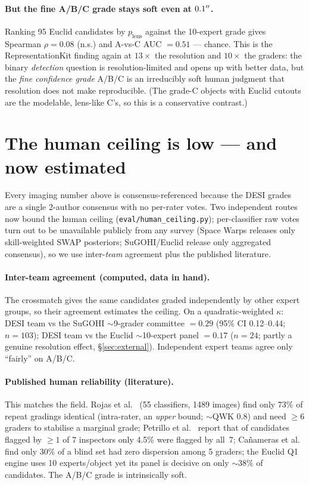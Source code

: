 \documentclass[11pt,letterpaper]{article}
\newcommand{\plens}{\ensuremath{p_{\mathrm{lens}}}}
\newcommand{\eucRankRho}{0.08}       %
\newcommand{\eucRankAUC}{0.51}       %
\newcommand{\ceilSugohi}{0.29}       %
\newcommand{\ceilSugohiCI}{0.12--0.44}
\newcommand{\ceilEuclid}{0.17}       %
\newcommand{\rojasIntra}{73}         %
\newcommand{\rojasQWK}{0.8}          %
\newcommand{\euclidDecisive}{38}     %
\begin{document}
\paragraph{But the fine A/B/C grade stays soft even at $0.1^{\prime\prime}$.} Ranking 95 Euclid candidates
by \plens{} against the 10-expert grade gives Spearman $\rho=\eucRankRho$ (n.s.) and A-vs-C
AUC $=\eucRankAUC$ --- chance. This is the RepresentationKit finding again at $13\times$ the
resolution and $10\times$ the graders: the binary \emph{detection} question is resolution-limited
and opens up with better data, but the \emph{fine confidence grade} A/B/C is an irreducibly soft
human judgment that resolution does not make reproducible. (The grade-C objects with Euclid cutouts
are the modelable, lens-like C's, so this is a conservative contrast.)

\section{The human ceiling is low --- and now estimated}
\label{sec:ceiling}
Every imaging number above is consensus-referenced because the DESI grades are a single
2-author consensus with no per-rater votes. Two independent routes now bound the human ceiling
(\texttt{eval/human\_ceiling.py}); per-classifier raw votes turn out to be unavailable publicly
from any survey (Space Warps releases only skill-weighted SWAP posteriors; SuGOHI/Euclid release
only aggregated consensus), so we use inter-\emph{team} agreement plus the published literature.

\paragraph{Inter-team agreement (computed, data in hand).} The crossmatch gives the same candidates
graded independently by other expert groups, so their agreement estimates the ceiling. On a
quadratic-weighted $\kappa$: DESI team vs the SuGOHI $\sim$9-grader committee $=\ceilSugohi$
(95\% CI \ceilSugohiCI; $n=103$); DESI team vs the Euclid $\sim$10-expert panel $=\ceilEuclid$
($n=24$; partly a genuine resolution effect, \S\ref{sec:external}). Independent expert teams agree
only ``fairly'' on A/B/C.

\paragraph{Published human reliability (literature).} This matches the field. Rojas et al.\
\citep{rojas2023vi} (55 classifiers, 1489 images) find only $\rojasIntra\%$ of repeat gradings
identical (intra-rater, an \emph{upper} bound; $\sim$QWK $\rojasQWK$) and need $\ge6$ graders to
stabilise a marginal grade; Petrillo et al.\ \citep{petrillo2019links} report that of candidates
flagged by $\ge1$ of 7 inspectors only 4.5\% were flagged by all~7; Ca\~nameras et al.\
\citep{canameras2021holismokes} find only 30\% of a blind set had zero dispersion among 5 graders;
the Euclid Q1 engine \citep{euclidq1engine} uses 10 experts/object yet its panel is decisive on
only ${\sim}\euclidDecisive\%$ of candidates. The A/B/C grade is intrinsically soft.
\end{document}
